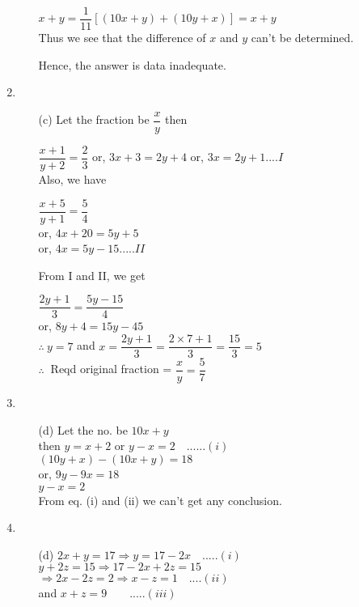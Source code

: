 \begin{multicols}{2}
\begin{enumerate}
\begin{itemize}
    $x + y = \dfrac{1}{11} \left[(10x + y) + (10y + x)\right] = x + y$\\
    Thus we see that the difference of $x$ and $y$ can't be determined.

    Hence, the answer is data inadequate.
  \end{itemize}
\item
  \begin{itemize}
  \item[(c)] Let the fraction be $\dfrac{x}{y}$ then

    $\dfrac{x + 1}{y + 2} = \dfrac{2}{3}$ or, $3x + 3 = 2y + 4$ or, $3x = 2y + 1 ....I$\\
    Also, we have

    $\dfrac{x + 5}{y + 1} = \dfrac{5}{4}$\\
    or, $4x + 20 = 5y + 5$\\
    or, $4x = 5y - 15 .....II$

    From I and II, we get

    $\dfrac{2y + 1}{3} = \dfrac{5y - 15}{4}$\\
    or, $8y + 4 = 15y - 45$\\
    $\therefore~ y = 7$ and $x = \dfrac{2y + 1}{3} = \dfrac{2 \times 7 + 1}{3} = \dfrac{15}{3} = 5$\\
    $\therefore~$ Reqd original fraction = $\dfrac{x}{y} = \dfrac{5}{7}$
  \end{itemize}
\item
  \begin{itemize}
  \item[(d)] Let the no. be $10x + y$\\
    then $y = x + 2$ or $y - x = 2 \quad ......(i)$\\
    $(10y + x) - (10x + y) = 18$\\
    or, $9y - 9x = 18$\\
    $y - x = 2$\\
    From eq. (i) and (ii) we can't get any conclusion.
  \end{itemize}
\item
  \begin{itemize}
  \item[(d)] $2x + y = 17 \Rightarrow y = 17 - 2x \quad .....(i)$\\
    $y + 2z = 15 \Rightarrow 17 - 2x + 2z = 15$\\
    $\Rightarrow 2x - 2z = 2 \Rightarrow x - z = 1 \quad ....(ii)$\\
    and $x + z = 9 \qquad .....(iii)$


\end{itemize}
\end{enumerate}
\end{multicols}
